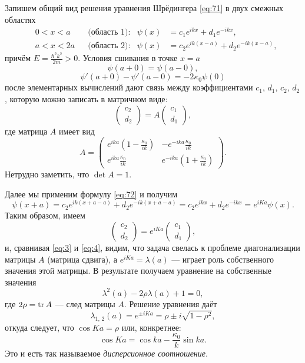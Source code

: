 \documentclass[a4paper]{article}
\begin{document}
\begin{sol}
Запишем общий вид решения уравнения Шрёдингера  \eqref{eq:71}
в двух смежных областях
\begin{align*}
	&0<x<a & &\text{(область 1):} &\psi(x)&= c_1 e^{ikx}+
	d_1 e^{-ikx},\\
	&a<x<2a & &\text{(область 2):}& \psi(x)&=c_2 e^{ik(x-a)}+
	d_2 e^{-ik(x-a)},
\end{align*}
причём $E= \frac{\hbar^2 k^2}{2m}>0$. Условия сшивания в точке
$x=a$ 
\[
	\psi(a+0)=\psi(a-0),
\]
\[
	\psi'(a+0)-\psi'(a-0)= -2 \kappa_0 \psi (0)
\] 
после элементарных вычислений дают связь между коэффициентами
$c_1$, $d_1$, $c_2$, $d_2$, которую можно записать в матричном
виде:
\begin{equation}
	\begin{pmatrix} c_2\\ d_2 \end{pmatrix} =A
	\begin{pmatrix} c_1 \\ d_1 \end{pmatrix} 
	\label{73}
,\end{equation}
где матрица $A$ имеет вид
\[
	A=\begin{pmatrix} e^{ika} \left( 1- \frac{\kappa_0}{ik} \right) & -e^{-ika} \frac{\kappa_0}{ik}\\ e^{ika} \frac{\kappa_0}{ik} & e^{-ika}\left( 1+ \frac{\kappa_0}{ik} \right)  \end{pmatrix} 
.\] 
Нетрудно заметить, что $\det A=1$.

Далее мы применим формулу \eqref{eq:72} и получим
\[
	\psi(x+a)= c_2 e^{i k (x+a-a)}+d_2 e^{- ik (x+a-a)}=
	c_2 e^{ikx}+d_2 e^{-ikx}=e^{iKa}\psi(x)
.\] 
Таким образом, имеем
\begin{equation}
\begin{pmatrix} c_2 \\ d_2 \end{pmatrix} = e^{iKa}
\begin{pmatrix} c_1 \\ d_1 \end{pmatrix} 
\label{eq:74}
,\end{equation} 
и, сравнивая \eqref{eq:3} и \eqref{eq:4}, видим, что задача
свелась к проблеме диагонализации матрицы $A$ (матрица сдвига),
а $e^{iKa}=\lambda (a)$ --- играет роль собственного значения
этой матрицы. В результате получаем уравнение на собственные
значения
\[
	\lambda^2 (a)-2\rho \lambda(a)+1=0
,\] 
где $2\rho=\operatorname*{\mathop{tr}} A $ --- след матрицы $A$. Решение уравнения даёт
\[
	\lambda_{1,\,2}(a)= e^{\pm iKa}= \rho\pm i \sqrt{1-\rho^2} 
,\] 
откуда следует, что $\cos Ka =\rho$ или, конкретнее:
\begin{equation}
\cos Ka=\cos ka - \frac{\kappa_0}{k}\sin ka
\label{eq:75}
.\end{equation} 
Это и есть так называемое \emph{дисперсионное соотношение}.


\end{sol}
\end{document}
